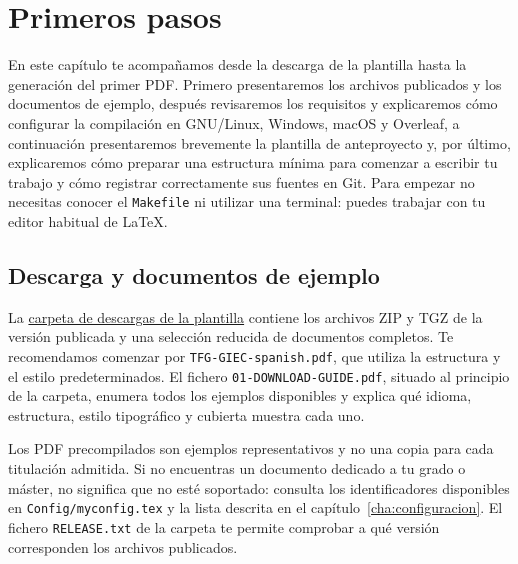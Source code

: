 %

\chapter{Primeros pasos}
\label{cha:primeros-pasos}

En este capítulo te acompañamos desde la descarga de la plantilla hasta la generación del primer PDF. Primero presentaremos los archivos publicados y los documentos de ejemplo, después revisaremos los requisitos y explicaremos cómo configurar la compilación en GNU/Linux, Windows, macOS y Overleaf, a continuación presentaremos brevemente la plantilla de anteproyecto y, por último, explicaremos cómo preparar una estructura mínima para comenzar a escribir tu trabajo y cómo registrar correctamente sus fuentes en Git. Para empezar no necesitas conocer el \texttt{Makefile} ni utilizar una terminal: puedes trabajar con tu editor habitual de \LaTeX{}.

\section{Descarga y documentos de ejemplo}
\label{sec:descarga-ejemplos}

La \href{https://www.dropbox.com/sh/mm6fwh3ruuuyjz2/AABDUmo7Xj1S968FeJgbmFPva?dl=0}{carpeta de descargas de la plantilla} contiene los archivos ZIP y TGZ de la versión publicada y una selección reducida de documentos completos. Te recomendamos comenzar por \texttt{TFG-GIEC-spanish.pdf}, que utiliza la estructura y el estilo predeterminados. El fichero \texttt{01-DOWNLOAD-GUIDE.pdf}, situado al principio de la carpeta, enumera todos los ejemplos disponibles y explica qué idioma, estructura, estilo tipográfico y cubierta muestra cada uno.

Los PDF precompilados son ejemplos representativos y no una copia para cada titulación admitida. Si no encuentras un documento dedicado a tu grado o máster, no significa que no esté soportado: consulta los identificadores disponibles en \texttt{Config/myconfig.tex} y la lista descrita en el capítulo~\ref{cha:configuracion}. El fichero \texttt{RELEASE.txt} de la carpeta te permite comprobar a qué versión corresponden los archivos publicados.

